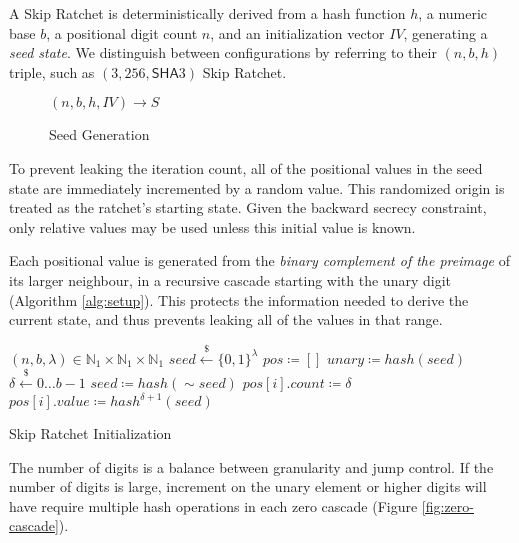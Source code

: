 \documentclass{article}
\begin{document}
	A Skip Ratchet is deterministically derived from a hash function $h$, a numeric base $b$, a positional digit count $n$, and an initialization vector $IV$, generating a \emph{seed state}. We distinguish between configurations by referring to their $(n, b, h)$ triple, such as $(3, 256, \textsf{SHA}3)$ Skip Ratchet.

	\begin{figure}[h]
		\centering
	
		$(n, b, h, IV) \rightarrow S$
	
		\caption{Seed Generation}
		\label{fig:config}
	\end{figure}
	
	To prevent leaking the iteration count, all of the positional values in the seed state are immediately incremented by a random value. This randomized origin is treated as the ratchet's starting state. Given the backward secrecy constraint, only relative values may be used unless this initial value is known.
	
	Each positional value is generated from the \emph{binary complement of the preimage} of its larger neighbour, in a recursive cascade starting with the unary digit (Algorithm \ref{alg:setup}). This protects the information needed to derive the current state, and thus prevents leaking all of the values in that range.
		
	\begin{algorithm}
		\begin{algorithmic}[1]
			\Require $(n, b, \lambda) \in \mathbb{N}_{1}\times{\mathbb{N}_{1}\times{\mathbb{N}_{1}}}$
			\State $seed \overset{\$}{\gets} \lbrace 0, 1 \rbrace^{\lambda}$
			\State $pos   \coloneqq []$
			\State $unary \coloneqq hash(seed)$
			 
				\State $\delta \overset{\$}{\gets} 0\ldots{b - 1}$
				\State $seed \coloneqq hash(\sim{seed})$ 
				\State $pos[i].count \coloneqq \delta$
				\State $pos[i].value \coloneqq hash^{\delta + 1}(seed)$
			\EndFor
			\\
		\end{algorithmic}
	
		\caption{Skip Ratchet Initialization}
		\label{alg:setup}
	\end{algorithm}

	The number of digits is a balance between granularity and jump control. If the number of digits is large, increment on the unary element or higher digits will have require multiple hash operations in each zero cascade (Figure \ref{fig:zero-cascade}).
	
\end{document}
